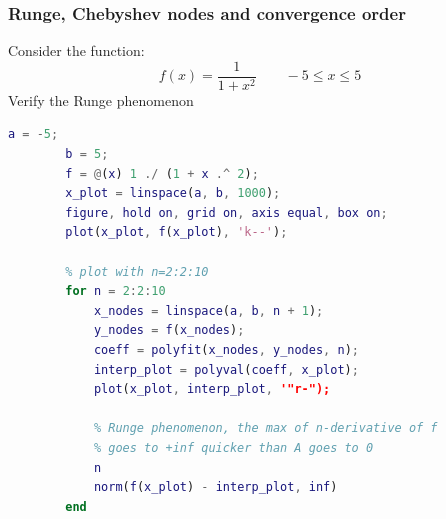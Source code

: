     \subsubsection{Runge, Chebyshev nodes and convergence order}
        Consider the function:
        $$
        f(x)=\frac{1}{1+x^2}
        \qquad
        -5\leq x \leq 5
        $$
        Verify the Runge phenomenon
        \begin{lstlisting}[language=Matlab, escapeinside=`', gobble=8]
        a = -5;
        b = 5;
        f = @(x) 1 ./ (1 + x .^ 2);
        x_plot = linspace(a, b, 1000);
        figure, hold on, grid on, axis equal, box on;
        plot(x_plot, f(x_plot), 'k--');
        
        % plot with n=2:2:10
        for n = 2:2:10
            x_nodes = linspace(a, b, n + 1);
            y_nodes = f(x_nodes);
            coeff = polyfit(x_nodes, y_nodes, n);
            interp_plot = polyval(coeff, x_plot);
            plot(x_plot, interp_plot, '"r-");
        
            % Runge phenomenon, the max of n-derivative of f
            % goes to +inf quicker than A goes to 0
            n
            norm(f(x_plot) - interp_plot, inf)
        end
        \end{lstlisting}

